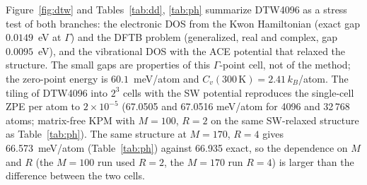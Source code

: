 \documentclass[reprint,nofootinbib,superscriptaddress,amsmath,amssymb,aps,prb,floatfix]{revtex4-2}
\begin{document}
Figure~\ref{fig:dtw} and Tables~\ref{tab:dd}, \ref{tab:ph} summarize DTW4096 as a stress test of both branches: the electronic DOS from the Kwon Hamiltonian (exact gap $0.0149$~eV at $\Gamma$) and the DFTB problem (generalized, real and complex, gap $0.0095$~eV), and the vibrational DOS with the ACE potential \cite{rosset2026} that relaxed the structure.
The small gaps are properties of this $\Gamma$-point cell, not of the method; the zero-point energy is $60.1$~meV/atom and $C_v(300\,\mathrm{K})=2.41\,k_B$/atom.
The tiling of DTW4096 into $2^3$ cells with the SW potential reproduces the single-cell ZPE per atom to $2\times10^{-5}$ (67.0505 and 67.0516 meV/atom for 4096 and 32\,768 atoms; matrix-free KPM with $M=100$, $R=2$ on the same SW-relaxed structure as Table~\ref{tab:ph}). The same structure at $M=170$, $R=4$ gives 66.573~meV/atom (Table~\ref{tab:ph}) against 66.935 exact, so the dependence on $M$ and $R$ (the $M=100$ run used $R=2$, the $M=170$ run $R=4$) is larger than the difference between the two cells.
\end{document}
